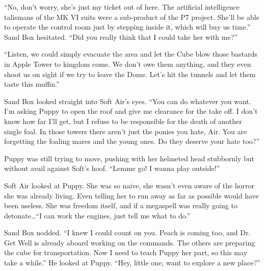 ``No, don't worry, she's just my ticket out of here. The artificial intelligence talismans of the MK VI suits were a sub-product of the P7 project. She'll be able to operate the control room just by stepping inside it, which will buy us time.'' Sand Box hesitated. ``Did you really think that I could take her with me?''

``Listen, we could simply evacuate the area and let the Cube blow those bastards in Apple Tower to kingdom come. We don't owe them anything, and they even shoot us on sight if we try to leave the Dome. Let's hit the tunnels and let them taste this muffin.''

Sand Box looked straight into Soft Air's eyes. ``You can do whatever you want. I'm asking Puppy to open the roof and give me clearance for the take off. I don't know how far I'll get, but I refuse to be responsible for the death of another single foal. In those towers there aren't just the ponies you hate, Air. You are forgetting the foaling mares and the young ones. Do they deserve your hate too?''

Puppy was still trying to move, pushing with her helmeted head stubbornly but without avail against Soft's hoof. ``Lemme go! I wanna play outside!''

Soft Air looked at Puppy. She was so naive, she wasn't even aware of the horror she was already living. Even telling her to run away as far as possible would have been useless. She was freedom itself, and if a megaspell was really going to detonate\dots ``I can work the engines, just tell me what to do.''

Sand Box nodded. ``I knew I could count on you. Peach is coming too, and Dr. Get Well is already aboard working on the commands. The others are preparing the cube for transportation. Now I need to teach Puppy her part, so this may take a while.'' He looked at Puppy. ``Hey, little one, want to explore a new place?''


\horizonline






